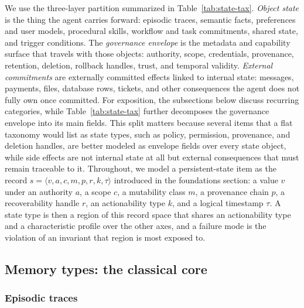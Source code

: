 We use the three-layer partition summarized in Table~\ref{tab:state-tax}. \emph{Object state} is the thing the agent carries forward: episodic traces, semantic facts, preferences and user models, procedural skills, workflow and task commitments, shared state, and trigger conditions. The \emph{governance envelope} is the metadata and capability surface that travels with those objects: authority, scope, credentials, provenance, retention, deletion, rollback handles, trust, and temporal validity. \emph{External commitments} are externally committed effects linked to internal state: messages, payments, files, database rows, tickets, and other consequences the agent does not fully own once committed. For exposition, the subsections below discuss recurring categories, while Table~\ref{tab:state-tax} further decomposes the governance envelope into its main fields. This split matters because several items that a flat taxonomy would list as state types, such as policy, permission, provenance, and deletion handles, are better modeled as envelope fields over every state object, while side effects are not internal state at all but external consequences that must remain traceable to it. Throughout, we model a persistent-state item as the record $s = \langle v, a, c, m, p, r, k, \tau \rangle$ introduced in the foundations section: a value $v$ under an authority $a$, a scope $c$, a mutability class $m$, a provenance chain $p$, a recoverability handle $r$, an actionability type $k$, and a logical timestamp $\tau$. A state type is then a region of this record space that shares an actionability type and a characteristic profile over the other axes, and a failure mode is the violation of an invariant that region is most exposed to.

\subsection{Memory types: the classical core}

\subsubsection{Episodic traces}

